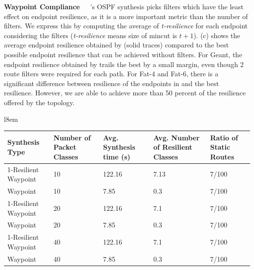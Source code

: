 \noindent\textbf{Waypoint Compliance}~~~\name's OSPF synthesis picks
filters which have the least effect on endpoint resilience, as it  
is a more important metric than the number of filters. We express this
by computing the average of \emph{t-resilience} for each endpoint considering
the filters (\emph{t-resilience} means size of mincut is $t+1$).
(c) shows the average
endpoint resilience obtained by \name (solid traces) 
compared to the best possible endpoint resilience that  can be achieved
without filters. For Geant, the endpoint 
resilience obtained by \name trails the best by a small margin,
even though 2 route filters were required for each path. For
Fat-4 and Fat-6, there is a significant difference between resilience
of the endpoints in \name and the best resilience. 
However, we are able to achieve more than
50 percent of the resilience offered by the topology. 

\begin{table}{l}{8em}
	\begin{footnotesize}
		\begin{center}
			\begin{tabular}{P{10em}| P{4em} | P{4em} | P{4em} | P{4em}}
				Synthesis Type & Number of Packet Classes & Avg. Synthesis time (s) & Avg. Number of Resilient Classes & Ratio of Static Routes \\
				-Resilient Waypoint & 10 & 122.16 & 7.13 & 7/100\\
				Waypoint & 10 & 7.85 & 0.3 & 7/100\\
				1-Resilient Waypoint & 20 & 122.16 & 7.1 & 7/100\\
				Waypoint & 20 & 7.85 & 0.3 & 7/100\\
				1-Resilient Waypoint & 40 & 122.16 & 7.1 & 7/100\\
				Waypoint & 40 & 7.85 & 0.3 & 7/100\\
			\end{tabular}
		\end{center}
		 \label{tab:waypointeval} 
	\end{footnotesize}
\end{table} 


